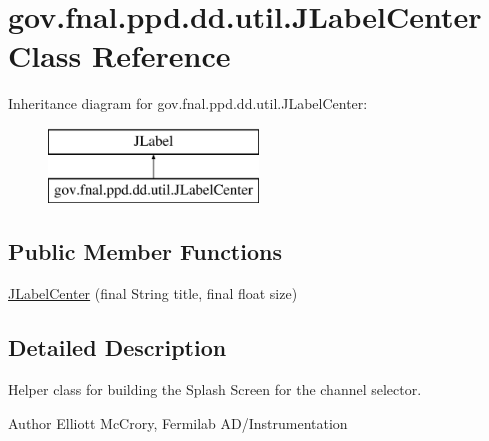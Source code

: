 \hypertarget{classgov_1_1fnal_1_1ppd_1_1dd_1_1util_1_1JLabelCenter}{\section{gov.\-fnal.\-ppd.\-dd.\-util.\-J\-Label\-Center Class Reference}
\label{classgov_1_1fnal_1_1ppd_1_1dd_1_1util_1_1JLabelCenter}
}
Inheritance diagram for gov.\-fnal.\-ppd.\-dd.\-util.\-J\-Label\-Center\-:\begin{figure}[H]
\begin{center}
\leavevmode
\includegraphics[height=2.000000cm]{classgov_1_1fnal_1_1ppd_1_1dd_1_1util_1_1JLabelCenter}
\end{center}
\end{figure}
\subsection*{Public Member Functions}
\begin{DoxyCompactItemize}
\item 
\hyperlink{classgov_1_1fnal_1_1ppd_1_1dd_1_1util_1_1JLabelCenter_a6223bcd346ebe5b17863464b2ed74379}{J\-Label\-Center} (final String title, final float size)
\end{DoxyCompactItemize}


\subsection{Detailed Description}
Helper class for building the Splash Screen for the channel selector.

\begin{DoxyAuthor}{Author}
Elliott Mc\-Crory, Fermilab A\-D/\-Instrumentation 
\end{DoxyAuthor}



